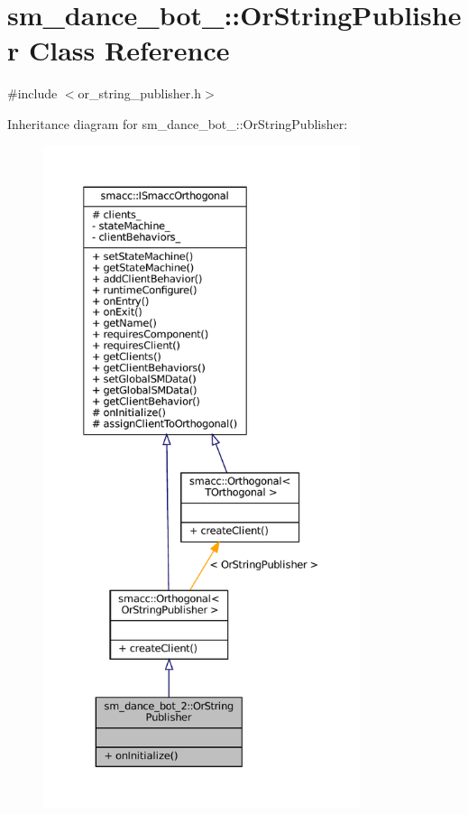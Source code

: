 \hypertarget{classsm__dance__bot__2_1_1OrStringPublisher}{}\section{sm\+\_\+dance\+\_\+bot\+\_\+:\+:Or\+String\+Publisher Class Reference}
\label{classsm__dance__bot__2_1_1OrStringPublisher}


{\ttfamily \#include $<$or\+\_\+string\+\_\+publisher.\+h$>$}



Inheritance diagram for sm\+\_\+dance\+\_\+bot\+\_\+:\+:Or\+String\+Publisher\+:
\nopagebreak
\begin{figure}[H]
\begin{center}
\leavevmode
\includegraphics[height=550pt]{classsm__dance__bot__2_1_1OrStringPublisher__inherit__graph}
\end{center}
\end{figure}


